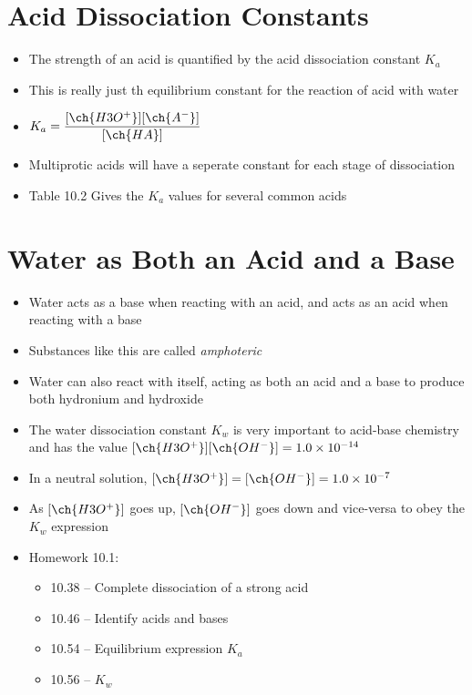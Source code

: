 \documentclass[12pt, openany, letterpaper]{memoir}
\begin{document}
\section{Acid Dissociation Constants}
\begin{itemize}
	\item The strength of an acid is quantified by the acid dissociation constant $K_a$
	\item This is really just th equilibrium constant for the reaction of acid with water
	\item $K_a=\dfrac{[\ch{H3O^+}][\ch{A^-}]}{[\ch{HA}]}$
	\item Multiprotic acids will have a seperate constant for each stage of dissociation
	\item Table 10.2 Gives the $K_a$ values for several common acids
\end{itemize}
\section{Water as Both an Acid and a Base}
\begin{itemize}
	\item Water acts as a base when reacting with an acid, and acts as an acid when reacting with a base
	\item Substances like this are called \emph{amphoteric}
	\item Water can also react with itself, acting as both an acid and a base to produce both hydronium and hydroxide
	\item The water dissociation constant $K_w$ is very important to acid-base chemistry and has the value $[\ch{H3O^+}][\ch{OH^-}]=1.0\times10^{-14}$
	\item In a neutral solution, $[\ch{H3O^+}] = [\ch{OH^-}] = 1.0\times10^{-7}$
	\item As $[\ch{H3O^+}]$ goes up, $[\ch{OH^-}]$ goes down and vice-versa to obey the $K_w$ expression
	\item Homework 10.1:
	\begin{itemize}
		\item 10.38 -- Complete dissociation of a strong acid 
		\item 10.46 -- Identify acids and bases
		\item 10.54 -- Equilibrium expression $K_a$
		\item 10.56 -- $K_w$
	\end{itemize}
\end{itemize}
\end{document}
